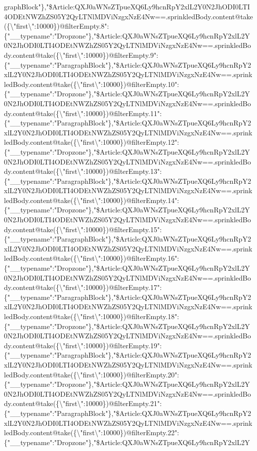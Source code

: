 graphBlock"\},"\$Article:QXJ0aWNsZTpueXQ6Ly9hcnRpY2xlL2Y0N2JhODI0LTI4ODEtNWZhZS05Y2QyLTNlMDViNzgxNzE4Nw==.sprinkledBody.content@take(\{\textbackslash{}"first\textbackslash{}":10000\})@filterEmpty.8":\{"\_\_typename":"Dropzone"\},"\$Article:QXJ0aWNsZTpueXQ6Ly9hcnRpY2xlL2Y0N2JhODI0LTI4ODEtNWZhZS05Y2QyLTNlMDViNzgxNzE4Nw==.sprinkledBody.content@take(\{\textbackslash{}"first\textbackslash{}":10000\})@filterEmpty.9":\{"\_\_typename":"ParagraphBlock"\},"\$Article:QXJ0aWNsZTpueXQ6Ly9hcnRpY2xlL2Y0N2JhODI0LTI4ODEtNWZhZS05Y2QyLTNlMDViNzgxNzE4Nw==.sprinkledBody.content@take(\{\textbackslash{}"first\textbackslash{}":10000\})@filterEmpty.10":\{"\_\_typename":"Dropzone"\},"\$Article:QXJ0aWNsZTpueXQ6Ly9hcnRpY2xlL2Y0N2JhODI0LTI4ODEtNWZhZS05Y2QyLTNlMDViNzgxNzE4Nw==.sprinkledBody.content@take(\{\textbackslash{}"first\textbackslash{}":10000\})@filterEmpty.11":\{"\_\_typename":"ParagraphBlock"\},"\$Article:QXJ0aWNsZTpueXQ6Ly9hcnRpY2xlL2Y0N2JhODI0LTI4ODEtNWZhZS05Y2QyLTNlMDViNzgxNzE4Nw==.sprinkledBody.content@take(\{\textbackslash{}"first\textbackslash{}":10000\})@filterEmpty.12":\{"\_\_typename":"Dropzone"\},"\$Article:QXJ0aWNsZTpueXQ6Ly9hcnRpY2xlL2Y0N2JhODI0LTI4ODEtNWZhZS05Y2QyLTNlMDViNzgxNzE4Nw==.sprinkledBody.content@take(\{\textbackslash{}"first\textbackslash{}":10000\})@filterEmpty.13":\{"\_\_typename":"ParagraphBlock"\},"\$Article:QXJ0aWNsZTpueXQ6Ly9hcnRpY2xlL2Y0N2JhODI0LTI4ODEtNWZhZS05Y2QyLTNlMDViNzgxNzE4Nw==.sprinkledBody.content@take(\{\textbackslash{}"first\textbackslash{}":10000\})@filterEmpty.14":\{"\_\_typename":"Dropzone"\},"\$Article:QXJ0aWNsZTpueXQ6Ly9hcnRpY2xlL2Y0N2JhODI0LTI4ODEtNWZhZS05Y2QyLTNlMDViNzgxNzE4Nw==.sprinkledBody.content@take(\{\textbackslash{}"first\textbackslash{}":10000\})@filterEmpty.15":\{"\_\_typename":"ParagraphBlock"\},"\$Article:QXJ0aWNsZTpueXQ6Ly9hcnRpY2xlL2Y0N2JhODI0LTI4ODEtNWZhZS05Y2QyLTNlMDViNzgxNzE4Nw==.sprinkledBody.content@take(\{\textbackslash{}"first\textbackslash{}":10000\})@filterEmpty.16":\{"\_\_typename":"Dropzone"\},"\$Article:QXJ0aWNsZTpueXQ6Ly9hcnRpY2xlL2Y0N2JhODI0LTI4ODEtNWZhZS05Y2QyLTNlMDViNzgxNzE4Nw==.sprinkledBody.content@take(\{\textbackslash{}"first\textbackslash{}":10000\})@filterEmpty.17":\{"\_\_typename":"ParagraphBlock"\},"\$Article:QXJ0aWNsZTpueXQ6Ly9hcnRpY2xlL2Y0N2JhODI0LTI4ODEtNWZhZS05Y2QyLTNlMDViNzgxNzE4Nw==.sprinkledBody.content@take(\{\textbackslash{}"first\textbackslash{}":10000\})@filterEmpty.18":\{"\_\_typename":"Dropzone"\},"\$Article:QXJ0aWNsZTpueXQ6Ly9hcnRpY2xlL2Y0N2JhODI0LTI4ODEtNWZhZS05Y2QyLTNlMDViNzgxNzE4Nw==.sprinkledBody.content@take(\{\textbackslash{}"first\textbackslash{}":10000\})@filterEmpty.19":\{"\_\_typename":"ParagraphBlock"\},"\$Article:QXJ0aWNsZTpueXQ6Ly9hcnRpY2xlL2Y0N2JhODI0LTI4ODEtNWZhZS05Y2QyLTNlMDViNzgxNzE4Nw==.sprinkledBody.content@take(\{\textbackslash{}"first\textbackslash{}":10000\})@filterEmpty.20":\{"\_\_typename":"Dropzone"\},"\$Article:QXJ0aWNsZTpueXQ6Ly9hcnRpY2xlL2Y0N2JhODI0LTI4ODEtNWZhZS05Y2QyLTNlMDViNzgxNzE4Nw==.sprinkledBody.content@take(\{\textbackslash{}"first\textbackslash{}":10000\})@filterEmpty.21":\{"\_\_typename":"ParagraphBlock"\},"\$Article:QXJ0aWNsZTpueXQ6Ly9hcnRpY2xlL2Y0N2JhODI0LTI4ODEtNWZhZS05Y2QyLTNlMDViNzgxNzE4Nw==.sprinkledBody.content@take(\{\textbackslash{}"first\textbackslash{}":10000\})@filterEmpty.22":\{"\_\_typename":"Dropzone"\},"\$Article:QXJ0aWNsZTpueXQ6Ly9hcnRpY2xlL2Y